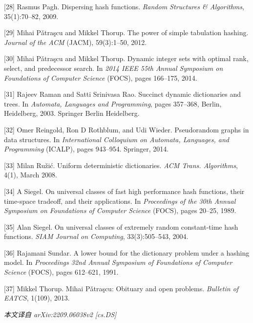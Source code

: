 \documentclass[12pt,a4paper]{ctexart}
\theoremstyle{remark}
\begin{document}
[28] Rasmus Pagh. Dispersing hash functions. \textit{Random Structures \& Algorithms}, 35(1):70--82, 2009.

[29] Mihai Pǎtraşcu and Mikkel Thorup. The power of simple tabulation hashing. \textit{Journal of the ACM} (JACM), 59(3):1--50, 2012.

[30] Mihai Pǎtraşcu and Mikkel Thorup. Dynamic integer sets with optimal rank, select, and predecessor search. In \textit{2014 IEEE 55th Annual Symposium on Foundations of Computer Science} (FOCS), pages 166--175, 2014.

[31] Rajeev Raman and Satti Srinivasa Rao. Succinct dynamic dictionaries and trees. In \textit{Automata, Languages and Programming}, pages 357--368, Berlin, Heidelberg, 2003. Springer Berlin Heidelberg.

[32] Omer Reingold, Ron D Rothblum, and Udi Wieder. Pseudorandom graphs in data structures. In \textit{International Colloquium on Automata, Languages, and Programming} (ICALP), pages 943--954. Springer, 2014.

[33] Milan Ružić. Uniform deterministic dictionaries. \textit{ACM Trans. Algorithms}, 4(1), March 2008.

[34] A Siegel. On universal classes of fast high performance hash functions, their time-space tradeoff, and their applications. In \textit{Proceedings of the 30th Annual Symposium on Foundations of Computer Science} (FOCS), pages 20--25, 1989.

[35] Alan Siegel. On universal classes of extremely random constant-time hash functions. \textit{SIAM Journal on Computing}, 33(3):505--543, 2004.

[36] Rajamani Sundar. A lower bound for the dictionary problem under a hashing model. In \textit{Proceedings 32nd Annual Symposium of Foundations of Computer Science} (FOCS), pages 612--621, 1991.

[37] Mikkel Thorup. Mihai Pǎtraşcu: Obituary and open problems. \textit{Bulletin of EATCS}, 1(109), 2013.

\medskip
\textit{本文译自 arXiv:2209.06038v2 [cs.DS]}
\end{document}
